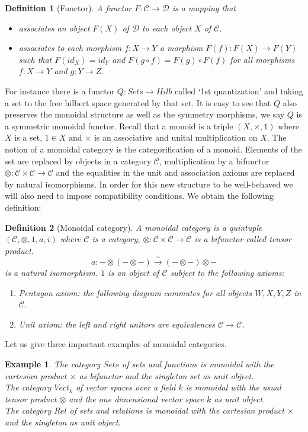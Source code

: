 \documentclass{article}
\newtheorem{definition}{Definition}
\newtheorem{example}{Example}
\begin{document}
\begin{definition}[Functor]
	A functor $F:\mathcal{C} \rightarrow \mathcal{D}$ is a mapping that
	\begin{itemize}
		\item associates an object $F(X)$ of $\mathcal{D}$ to each object $X$ of $\mathcal{C}$.
		\item associates to each morphism $f:X \rightarrow Y$ a morphism $F(f): F(X) \rightarrow F(Y)$ such that $F(id_X)=id_Y$ and $F(g\circ f)= F(g)\circ F(f)$ for all morphisms $f:X \rightarrow Y$ and $g:Y \rightarrow Z$.
	\end{itemize}
\end{definition}For instance there is a functor $Q: Sets \rightarrow Hilb$ called `1st quantization' and taking a set to the free hilbert space generated by that set. It is easy to see that $Q$ also preserves the monoidal structure as well as the symmetry morphisms, we say $Q$ is a symmetric monoidal functor.
Recall that a monoid is a triple $(X, \times, 1)$ where $X$ is a set, $1 \in X$ and $\times$ is an associative and unital multiplication on $X$. The notion of a monoidal category is the categorification of a monoid. Elements of the set are replaced by objects in a category $\mathcal{C}$, multiplication by a bifunctor $\otimes: \mathcal{C} \times \mathcal{C} \rightarrow \mathcal{C}$ and the equalities in the unit and association axioms are replaced by natural isomorphisms. In order for this new structure to be well-behaved we will also need to impose compatibility conditions.
We obtain the following definition:
\begin{definition}[Monoidal category]
A monoidal category is a quintuple $(\mathcal{C}, \otimes, 1, a, i)$ where $\mathcal{C}$ is a category, $\otimes: \mathcal{C} \times \mathcal{C} \rightarrow \mathcal{C}$ is a bifunctor called tensor product.
$$ a : -\otimes(- \otimes -) \xrightarrow{\sim} (-\otimes -) \otimes -$$ is a natural isomorphism. $1$ is an object of $\mathcal{C}$ subject to the following axioms:
\begin{enumerate}
    \item Pentagon axiom: the following diagram commutes for all objects $W,X,Y,Z$ in $\mathcal{C}$.
    \item Unit axiom: the left and right unitors are equivalences $\mathcal{C} \rightarrow \mathcal{C}$.
\end{enumerate}
\end{definition}
Let us give three important examples of monoidal categories.
\begin{example}
The category $Sets$ of sets and functions is monoidal with the cartesian product $\times$ as bifunctor and the singleton set as unit object.\\
The category $Vect_k$ of vector spaces over a field $k$ is monoidal with the usual tensor product $\otimes$ and the one dimensional vector space $k$ as unit object.\\
The category $Rel$ of sets and relations is monoidal with the cartesian product $\times$ and the singleton as unit object.
\end{example}
\end{document}

